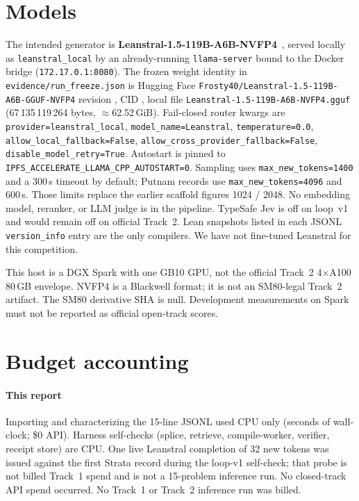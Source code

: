 \documentclass{article}
\begin{document}
\section{Models}
\label{models}

The intended generator is \textbf{Leanstral-1.5-119B-A6B-NVFP4}~\cite{leanstral}, served locally as \texttt{leanstral\_local} by an already-running \texttt{llama-server} bound to the Docker bridge (\texttt{172.17.0.1:8080}). The frozen weight identity in \texttt{evidence/run\_freeze.json} is Hugging Face \texttt{Frosty40/Leanstral-1.5-119B-A6B-GGUF-NVFP4} revision , CID , local file \texttt{Leanstral-1.5-119B-A6B-NVFP4.gguf} (67\,135\,119\,264 bytes, $\approx$62.52\,GiB). Fail-closed router kwargs are \texttt{provider=leanstral\_local}, \texttt{model\_name=Leanstral}, \texttt{temperature=0.0}, \texttt{allow\_local\_fallback=False}, \texttt{allow\_cross\_provider\_fallback=False}, \texttt{disable\_model\_retry=True}. Autostart is pinned to \texttt{IPFS\_ACCELERATE\_LLAMA\_CPP\_AUTOSTART=0}. Sampling uses \texttt{max\_new\_tokens=1400} and a 300\,s timeout by default; Putnam records use \texttt{max\_new\_tokens=4096} and 600\,s. Those limits replace the earlier scaffold figures 1024 / 2048. No embedding model, reranker, or LLM judge is in the pipeline. TypeSafe Jev is off on loop~v1 and would remain off on official Track~2. Lean snapshots listed in each JSONL \texttt{version\_info} entry are the only compilers. We have not fine-tuned Leanstral for this competition.

This host is a DGX Spark with one GB10 GPU, not the official Track~2 4$\times$A100 80\,GB envelope. NVFP4 is a Blackwell format; it is not an SM80-legal Track~2 artifact. The SM80 derivative SHA is null. Development measurements on Spark must not be reported as official open-track scores.

\section{Budget accounting}
\label{budget}

\paragraph{This report} Importing and characterizing the 15-line JSONL used CPU only (seconds of wall-clock; \$0 API). Harness self-checks (splice, retrieve, compile-worker, verifier, receipt store) are CPU. One live Leanstral completion of 32 new tokens was issued against the first Strata record during the loop-v1 self-check; that probe is not billed Track~1 spend and is not a 15-problem inference run. No closed-track API spend occurred. No Track~1 or Track~2 inference run was billed.
\end{document}
